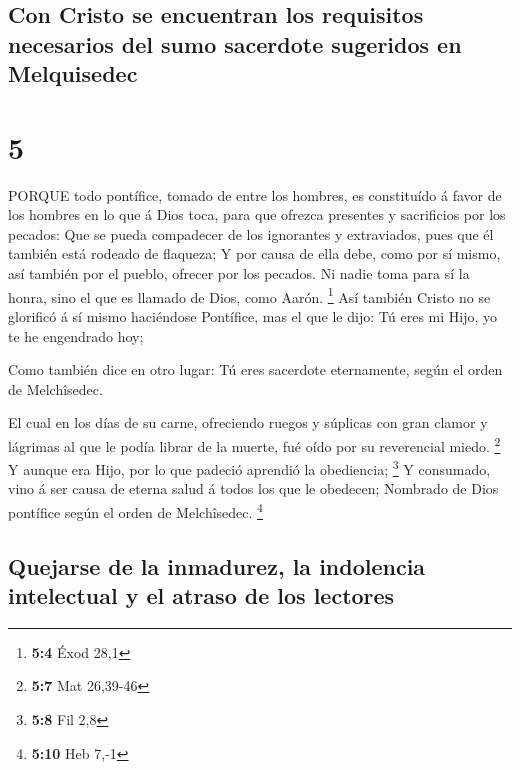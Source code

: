 \hypertarget{con-cristo-se-encuentran-los-requisitos-necesarios-del-sumo-sacerdote-sugeridos-en-melquisedec}{%
\subsection{Con Cristo se encuentran los requisitos necesarios del sumo
sacerdote sugeridos en
Melquisedec}\label{con-cristo-se-encuentran-los-requisitos-necesarios-del-sumo-sacerdote-sugeridos-en-melquisedec}}

\hypertarget{section-4}{%
\section{5}\label{section-4}}

 PORQUE todo pontífice, tomado de entre los hombres, es
constituído á favor de los hombres en lo que á Dios toca, para que
ofrezca presentes y sacrificios por los pecados:  Que se
pueda compadecer de los ignorantes y extraviados, pues que él también
está rodeado de flaqueza;  Y por causa de ella debe, como
por sí mismo, así también por el pueblo, ofrecer por los pecados.
 Ni nadie toma para sí la honra, sino el que es llamado de
Dios, como Aarón. \footnote{\textbf{5:4} Éxod 28,1}  Así
también Cristo no se glorificó á sí mismo haciéndose Pontífice, mas el
que le dijo: Tú eres mi Hijo, yo te he engendrado hoy;

 Como también dice en otro lugar: Tú eres sacerdote
eternamente, según el orden de Melchîsedec.

 El cual en los días de su carne, ofreciendo ruegos y
súplicas con gran clamor y lágrimas al que le podía librar de la muerte,
fué oído por su reverencial miedo. \footnote{\textbf{5:7} Mat 26,39-46}
 Y aunque era Hijo, por lo que padeció aprendió la
obediencia; \footnote{\textbf{5:8} Fil 2,8}  Y consumado,
vino á ser causa de eterna salud á todos los que le obedecen;
 Nombrado de Dios pontífice según el orden de Melchîsedec.
\footnote{\textbf{5:10} Heb 7,-1}

\hypertarget{quejarse-de-la-inmadurez-la-indolencia-intelectual-y-el-atraso-de-los-lectores}{%
\subsection{Quejarse de la inmadurez, la indolencia intelectual y el
atraso de los
lectores}\label{quejarse-de-la-inmadurez-la-indolencia-intelectual-y-el-atraso-de-los-lectores}}


